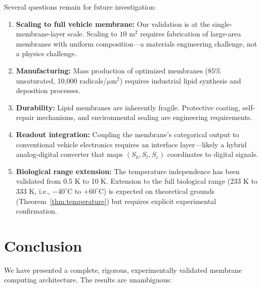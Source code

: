 \documentclass[twocolumn,10pt,a4paper]{article}
\theoremstyle{definition}
\theoremstyle{remark}
\newcommand{\Sk}{S_k}
\newcommand{\St}{S_t}
\newcommand{\Se}{S_e}
\begin{document}
Several questions remain for future investigation:
\begin{enumerate}[leftmargin=2em]
    \item \textbf{Scaling to full vehicle membrane:} Our validation is at the single-membrane-layer scale. Scaling to $10$ m$^2$ requires fabrication of large-area membranes with uniform composition---a materials engineering challenge, not a physics challenge.

    \item \textbf{Manufacturing:} Mass production of optimized membranes ($85\%$ unsaturated, 10,000 radicals/$\mu$m$^2$) requires industrial lipid synthesis and deposition processes.

    \item \textbf{Durability:} Lipid membranes are inherently fragile. Protective coating, self-repair mechanisms, and environmental sealing are engineering requirements.

    \item \textbf{Readout integration:} Coupling the membrane's categorical output to conventional vehicle electronics requires an interface layer---likely a hybrid analog-digital converter that maps $(\Sk, \St, \Se)$ coordinates to digital signals.

    \item \textbf{Biological range extension:} The temperature independence has been validated from 0.5 K to 10 K. Extension to the full biological range (233 K to 333 K, i.e., $-40^\circ$C to $+60^\circ$C) is expected on theoretical grounds (Theorem~\ref{thm:temperature}) but requires explicit experimental confirmation.
\end{enumerate}


\section{Conclusion}
\label{sec:conclusion}

We have presented a complete, rigorous, experimentally validated membrane computing architecture. The results are unambiguous:
\end{document}
